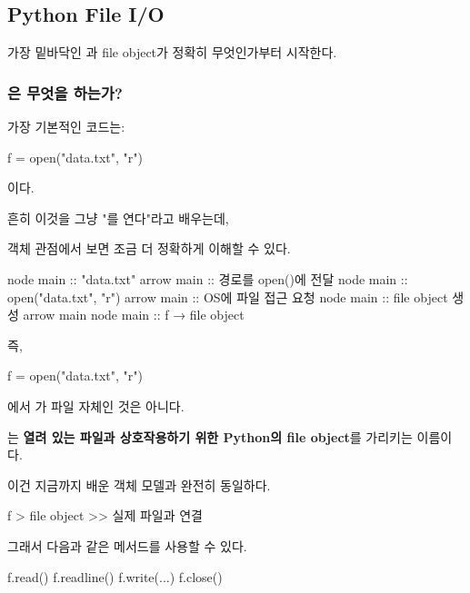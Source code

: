 


\subsection{Python File I/O}

가장 밑바닥인 과 file object가 정확히 무엇인가부터 시작한다.

\subsubsection{은 무엇을 하는가?}

가장 기본적인 코드는:

\begin{dhkcode}
f = open("data.txt", "r")
\end{dhkcode}

이다.

흔히 이것을 그냥 "를 연다"라고 배우는데,

객체 관점에서 보면 조금 더 정확하게 이해할 수 있다.

\begin{dhkbranch}[in=8]
node main :: "data.txt"
arrow main :: 경로를 open()에 전달
node main :: open("data.txt", "r")
arrow main :: OS에 파일 접근 요청
node main :: file object 생성
arrow main
node main :: f → file object
\end{dhkbranch}

즉,

\begin{dhkcode}
f = open("data.txt", "r")
\end{dhkcode}

에서 가 파일 자체인 것은 아니다.

는 \textbf{열려 있는 파일과 상호작용하기 위한 Python의 file object}를 가리키는 이름이다.

이건 지금까지 배운 객체 모델과 완전히 동일하다.

\begin{dhkdir}
f
> file object
>> 실제 파일과 연결
\end{dhkdir}

그래서 다음과 같은 메서드를 사용할 수 있다.

\begin{dhkcode}
f.read()
f.readline()
f.write(...)
f.close()
\end{dhkcode}

